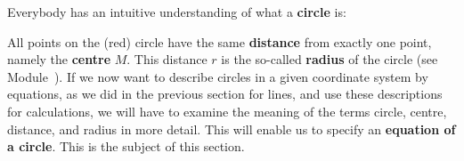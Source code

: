 \begin{MIntro}

Everybody has an intuitive understanding of what a \textbf{circle} is:

\begin{center}
%
\end{center}
All points on the (red) circle have the same \textbf{distance} from exactly one point, namely the 
\textbf{centre} $M$. This distance $r$ is the so-called \textbf{radius} of the circle (see Module~).
If we now want to describe circles in a given coordinate system by equations, as we did in the previous section 
for lines, and use these descriptions for calculations, we will have to examine the meaning of the terms circle, centre, 
distance, and radius in more detail. This will enable us to specify an \textbf{equation of a circle}. This is the subject 
of this section. 

\end{MIntro}

